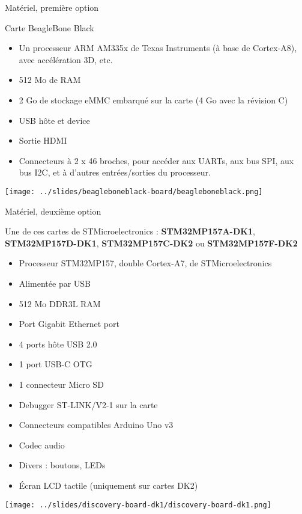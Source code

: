 \documentclass[a4paper,12pt,obeyspaces,spaces,hyphens]{article}
\begin{document}
\feshowtitle

\feshowinfo

\feagendatwocolumn
{Matériel, première option}
{
  Carte BeagleBone Black
  \begin{itemize}
  \item Un processeur ARM AM335x de Texas Instruments (à base de
    Cortex-A8), avec accélération 3D, etc.
  \item 512 Mo de RAM
  \item 2 Go de stockage eMMC embarqué sur la carte
        \newline(4 Go avec la révision C)
  \item USB hôte et device
  \item Sortie HDMI
  \item Connecteurs à 2 x 46 broches, pour accéder aux UARTs, aux
        bus SPI, aux bus I2C, et à d'autres entrées/sorties du
        processeur.
  \end{itemize}
}{}
{
  \begin{center}
    \texttt{[image: ../slides/beagleboneblack-board/beagleboneblack.png]}
  \end{center}
}

\feagendatwocolumn
{Matériel, deuxième option}
{
  Une de ces cartes de STMicroelectronics : {\bf
  STM32MP157A-DK1}, {\bf STM32MP157D-DK1}, {\bf STM32MP157C-DK2} ou
  {\bf STM32MP157F-DK2}
  \begin{itemize}
  \item Processeur STM32MP157, double Cortex-A7, de STMicroelectronics
  \item Alimentée par USB
  \item 512 Mo DDR3L RAM
  \item Port Gigabit Ethernet port
  \item 4 ports hôte USB 2.0
  \item 1 port USB-C OTG
  \item 1 connecteur Micro SD
  \item Debugger ST-LINK/V2-1 sur la carte
  \item Connecteurs compatibles Arduino Uno v3
  \item Codec audio
  \item Divers : boutons, LEDs
  \item Écran LCD tactile (uniquement sur cartes DK2)
  \end{itemize}
}{}
{
  \begin{center}
    \texttt{[image: ../slides/discovery-board-dk1/discovery-board-dk1.png]}
  \end{center}
}
\end{document}

